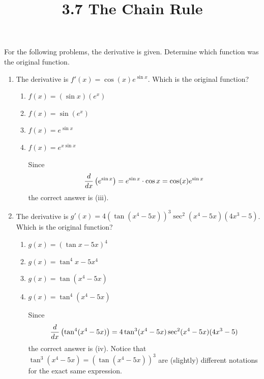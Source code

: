 \documentclass[nooutcomes]{ximera}
\title{3.7 The Chain Rule}
\begin{document}
\begin{abstract}		\end{abstract}
\maketitle

\begin{problem}
For the following problems, the derivative is given.  Determine which function was the original function.
	\begin{enumerate}
	
		\item  The derivative is $f'(x) = \cos (x) e^{\sin x}$.  Which is the original function?
		
			\begin{enumerate}
			
			\item  $f(x) = (\sin x)(e^x)$
			\item  $f(x) = \sin (e^x)$
			\item  $f(x) = e^{\sin x}$
			\item  $f(x) = e^{x \sin x}$
			
				\begin{freeResponse}
				Since
				$$ \frac{d}{dx} \left( e^{\sin x} \right) = e^{\sin x} \cdot \cos x = \cos(x) e^{\sin x} $$
				the correct answer is (iii).  
				\end{freeResponse}
				
			\end{enumerate}
			
			
			
		\item  The derivative is $g'(x) = 4 \left( \tan (x^4 - 5x) \right)^3 \sec^2(x^4-5x)(4x^3-5)$.  Which is the original function?
		
			\begin{enumerate}
			
			\item  $g(x) = \left( \tan x - 5x \right)^4$
			\item  $g(x) = \tan^4x - 5x^4$
			\item  $g(x) = \tan(x^4 - 5x)$
			\item  $g(x) = \tan^4(x^4-5x)$
			
				\begin{freeResponse}
				Since 
				$$\frac{d}{dx} \left( \tan^4(x^4-5x) \right) = 4 \tan^3(x^4-5x) \sec^2(x^4-5x) (4x^3-5)$$ 
				the correct answer is (iv).  Notice that $\tan^3(x^4-5x) = \left( \tan(x^4-5x) \right)^3$ are (slightly) different notations for the exact same expression.
				\end{freeResponse}
				
			\end{enumerate}
			
	\end{enumerate}
\end{problem}	
	
\end{document}
